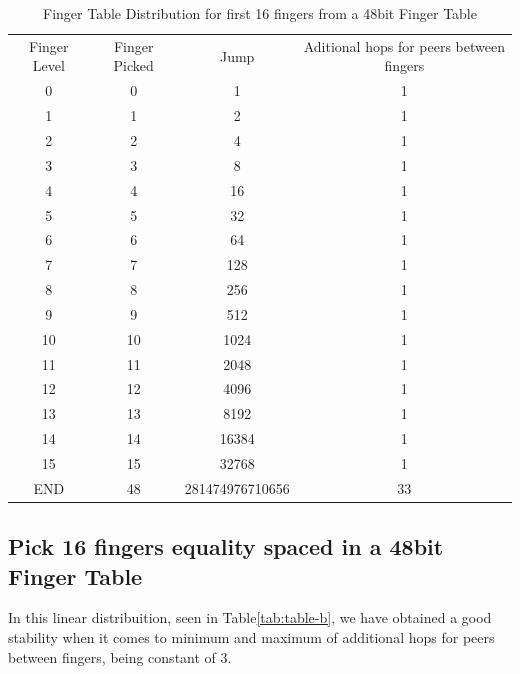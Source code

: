 \begin{table}
    \centering
    \begin{tabular}{| c | c | c | c |}
    \hline
        Finger Level &  Finger Picked & Jump & Aditional hops for peers between fingers \\
        0 & 0 & 1 & 1 \\
        1 & 1 & 2 & 1 \\
        2 & 2 & 4 & 1 \\
        3 & 3 & 8 & 1 \\
        4 & 4 & 16 & 1 \\
        5 & 5 & 32 & 1 \\
        6 & 6 & 64 & 1 \\
        7 & 7 & 128 & 1 \\
        8 & 8 & 256 & 1 \\
        9 & 9 & 512 & 1 \\
        10 & 10 & 1024 & 1 \\
        11 & 11 & 2048 & 1 \\
        12 & 12 & 4096 & 1 \\
        13 & 13 & 8192 & 1 \\
        14 & 14 & 16384 & 1 \\
        15 & 15 & 32768 & 1 \\
        END & 48 & 281474976710656 & 33 \\
    \hline
    \end{tabular}
    \caption{Finger Table Distribution for first 16 fingers from a 48bit Finger Table}
    \label{tbl:table-a}
\end{table}

\subsection{Pick 16 fingers equality spaced in a 48bit Finger Table}

In this linear distribuition, seen in Table\ref{tab:table-b}, we have obtained a good stability when it comes to minimum and maximum of additional hops for peers between fingers, being constant of 3.


